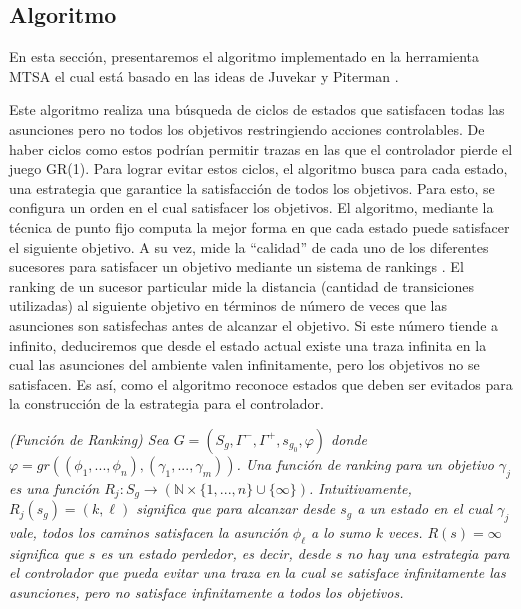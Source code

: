 \subsection{Algoritmo}

En esta sección, presentaremos el algoritmo implementado en la herramienta MTSA \cite{4639371} el cual está basado en las
ideas de Juvekar y Piterman \cite{Juvekar:buchi}.

Este algoritmo realiza una búsqueda de ciclos de estados que satisfacen todas las asunciones pero no todos los objetivos
restringiendo acciones controlables. De haber ciclos como estos podrían permitir trazas en las que el controlador
pierde el juego GR(1). Para lograr evitar estos ciclos, el algoritmo busca para cada estado, una estrategia que
garantice la satisfacción de todos los objetivos. Para esto, se configura un orden en el cual satisfacer los objetivos.
El algoritmo, mediante la técnica de punto fijo computa la mejor forma en que cada estado puede satisfacer el siguiente
objetivo. A su vez, mide la ``calidad'' de cada uno de los diferentes sucesores para satisfacer un objetivo mediante un
sistema de rankings \cite{Jurdzinski:ParityGames}. El ranking de un sucesor particular mide la distancia (cantidad de transiciones utilizadas)
al siguiente objetivo en términos de número de veces que las asunciones son satisfechas antes de alcanzar el objetivo.
Si este número tiende a infinito, deduciremos que desde el estado actual existe una traza infinita en la cual las
asunciones del ambiente valen infinitamente, pero los objetivos no se satisfacen. Es así, como el algoritmo reconoce
estados que deben ser evitados para la construcción de la estrategia para el controlador.

\begin{nahaDef}
    \emph{(Función de Ranking) Sea $G = (S_g,\Gamma^-,\Gamma^+,s_{g_0},\varphi)$ donde \\$\varphi = 
    gr(( \phi_1 ,..., \phi_n ),( \gamma_1 ,..., \gamma_m ) )$. Una función de ranking para un objetivo $\gamma_j$ es una función
    $R_j : S_g \rightarrow (\mathbb{N} \times \{1,...,n\}\cup\{\infty\})$. Intuitivamente, $R_j(s_g) = (k,\ell)$
    significa que para alcanzar desde $s_g$ a un estado en el cual $\gamma_j$ vale, todos los caminos satisfacen
    la asunción $\phi_{\ell}$ a lo sumo $k$ veces. $R(s) = \infty$ significa que $s$ es un estado perdedor, es decir,
    desde $s$ no hay una estrategia para el controlador que pueda evitar una traza en la cual se satisface infinitamente
    las asunciones, pero no satisface infinitamente a todos los objetivos.}
\end{nahaDef}

